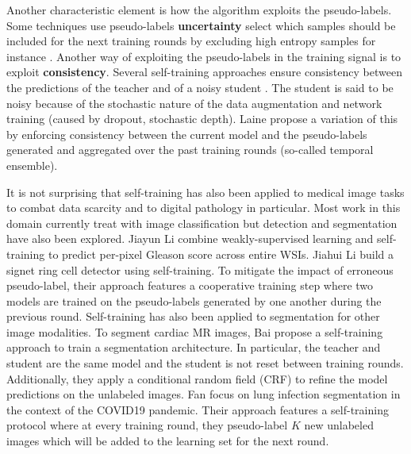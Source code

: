 Another characteristic element is how the algorithm exploits the pseudo-labels. Some techniques use pseudo-labels \textbf{uncertainty} select which samples should be included for the next training rounds by excluding high entropy samples for instance \cite{grandvalet2004semi, lee2013pseudo}. Another way of exploiting the pseudo-labels in the training signal is to exploit \textbf{consistency}. Several self-training approaches ensure consistency between the predictions of the teacher and of a noisy student \cite{xie2020self, zhu2020improving, sohn2020fixmatch, tarvainen2017mean}. The student is said to be noisy because of the stochastic nature of the data augmentation and network training (\eg caused by dropout, stochastic depth). Laine \etal \cite{laine2016temporal} propose a variation of this by enforcing consistency between the current model and the pseudo-labels generated and aggregated over the past training rounds (so-called temporal ensemble).


It is not surprising that self-training has also been applied to medical image tasks to combat data scarcity \cite{tajbakhsh2020embracing, peng2021medical} and to digital pathology in particular. Most work in this domain currently treat with image classification \cite{peikari2018cluster, su2019local, koohbanani2021self, jaiswal2019semi, shaw2020teacher} but detection and segmentation have also been explored. Jiayun Li \etal \cite{li2018based} combine weakly-supervised learning and self-training to predict per-pixel Gleason score across entire WSIs. Jiahui Li \etal \cite{li2019signet} build a signet ring cell detector using self-training. To mitigate the impact of erroneous pseudo-label, their approach features a cooperative training step where two models are trained on the pseudo-labels generated by one another during the previous round. Self-training has also been applied to segmentation for other image modalities. To segment cardiac MR images, Bai \etal \cite{bai2017semi} propose a self-training approach to train a segmentation architecture. In particular, the teacher and student are the same model and the student is not reset between training rounds. Additionally, they apply a conditional random field (CRF) to refine the model predictions on the unlabeled images. Fan \etal \cite{fan2020inf} focus on lung infection segmentation in the context of the COVID19 pandemic. Their approach features a self-training protocol where at every training round, they pseudo-label $K$ new unlabeled images which will be added to the learning set for the next round. 

